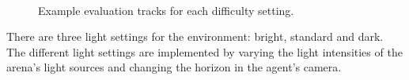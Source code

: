 \begin{figure}
    \centering
    \qquad
    \qquad
    \\
    \caption{Example evaluation tracks for each difficulty setting.}
    \label{fig:track_difficulty_settings}
\end{figure}


There are three light settings for the environment: bright, standard and dark. The different light settings are implemented by varying the light intensities of the arena's light sources and changing the horizon in the agent's camera.

